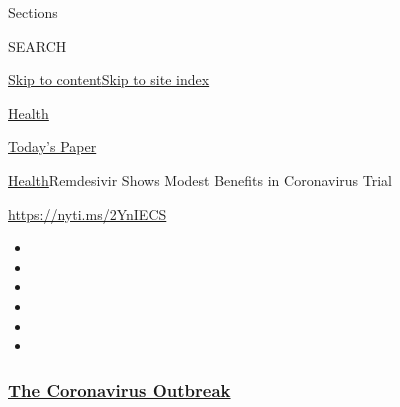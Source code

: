 Sections

SEARCH

\protect\hyperlink{site-content}{Skip to
content}\protect\hyperlink{site-index}{Skip to site index}

\href{https://www.nytimes3xbfgragh.onion/section/health}{Health}

\href{https://myaccount.nytimes3xbfgragh.onion/auth/login?response_type=cookie\&client_id=vi}{}

\href{https://www.nytimes3xbfgragh.onion/section/todayspaper}{Today's
Paper}

\href{/section/health}{Health}\textbar{}Remdesivir Shows Modest Benefits
in Coronavirus Trial

\url{https://nyti.ms/2YnIECS}

\begin{itemize}
\item
\item
\item
\item
\item
\item
\end{itemize}

\hypertarget{the-coronavirus-outbreak}{%
\subsubsection{\texorpdfstring{\href{https://www.nytimes3xbfgragh.onion/news-event/coronavirus?name=styln-coronavirus-national\&region=TOP_BANNER\&variant=undefined\&block=storyline_menu_recirc\&action=click\&pgtype=Article\&impression_id=e8659210-e39e-11ea-af8e-ffa98621719b}{The
Coronavirus
Outbreak}}{The Coronavirus Outbreak}}\label{the-coronavirus-outbreak}}

